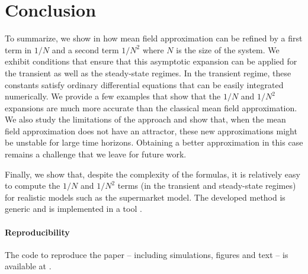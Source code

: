 \documentclass{sig-alternate-per-Performance2018}
\begin{document}
\section{Conclusion}

To summarize, we show in \cite{githubPaper2018} how mean field
approximation can be refined by a first term in $1/N$ and a second
term $1/N^2$ where $N$ is the size of the system. We exhibit
conditions that ensure that this asymptotic expansion can be applied
for the transient as well as the steady-state regimes. In the
transient regime, these constants satisfy ordinary differential
equations that can be easily integrated numerically.  We provide a few
examples that show that the $1/N$ and $1/N^2$ expansions are much more
accurate than the classical mean field approximation.  We also study
the limitations of the approach and show that, when the mean field
approximation does not have an attractor, these new approximations
might be unstable for large time horizons.  Obtaining a better
approximation in this case remains a challenge that we leave for
future work.

Finally, we show that, despite the complexity of the formulas, it is
relatively easy to compute the $1/N$ and $1/N^2$ terms (in the
transient and steady-state regimes) for realistic models such as the
supermarket model. The developed method is generic and is implemented
in a tool \cite{rmfTool2018}.


\paragraph*{Reproducibility} The code to reproduce the paper --
including simulations, figures and text -- is available at
\cite{githubPaper2018}.


\small 


\end{document}
